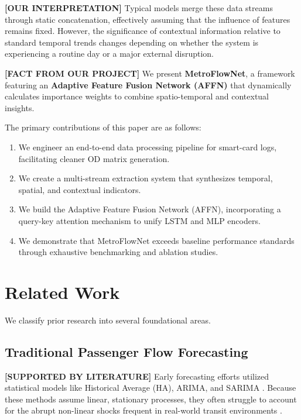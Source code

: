 \documentclass[conference]{IEEEtran}
\begin{document}
\noindent \textbf{[OUR INTERPRETATION]} Typical models merge these data streams through static concatenation, effectively assuming that the influence of features remains fixed. However, the significance of contextual information relative to standard temporal trends changes depending on whether the system is experiencing a routine day or a major external disruption.

\noindent \textbf{[FACT FROM OUR PROJECT]} We present \textbf{MetroFlowNet}, a framework featuring an \textbf{Adaptive Feature Fusion Network (AFFN)} that dynamically calculates importance weights to combine spatio-temporal and contextual insights.

\noindent The primary contributions of this paper are as follows:
\begin{enumerate}
    \item We engineer an end-to-end data processing pipeline for smart-card logs, facilitating cleaner OD matrix generation.
    \item We create a multi-stream extraction system that synthesizes temporal, spatial, and contextual indicators.
    \item We build the Adaptive Feature Fusion Network (AFFN), incorporating a query-key attention mechanism to unify LSTM and MLP encoders.
    \item We demonstrate that MetroFlowNet exceeds baseline performance standards through exhaustive benchmarking and ablation studies.
\end{enumerate}

\section{Related Work}
\label{sec:related_work}

We classify prior research into several foundational areas.

\subsection{Traditional Passenger Flow Forecasting}
\noindent \textbf{[SUPPORTED BY LITERATURE]} Early forecasting efforts utilized statistical models like Historical Average (HA), ARIMA, and SARIMA \cite{williams2003modeling, billings2006application}. Because these methods assume linear, stationary processes, they often struggle to account for the abrupt non-linear shocks frequent in real-world transit environments \cite{li2017diffusion}.
\end{document}
